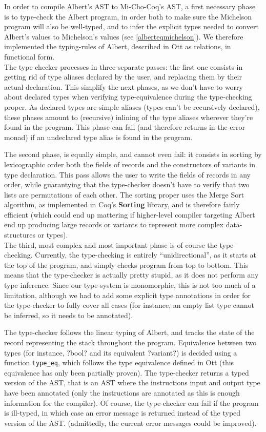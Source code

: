 \documentclass{report}
\begin{document}
In order to compile Albert's AST to Mi-Cho-Coq's AST, a first necessary phase is to type-check the Albert program, in order both to make sure the Michelson program will also be well-typed, and to infer the explicit types needed to convert Albert's values to Michelson's values (see \ref{alberteqmichelson}). We therefore implemented the typing-rules of Albert, described in Ott as relations, in functional form.\\

The type checker processes in three separate passes: the first one consists in getting rid of type aliases declared by the user, and replacing them by their actual declaration. This simplify the next phases, as we don't have to worry about declared types when verifying type-equivalence during the type-checking proper. As declared types are simple aliases (types can't be recursively declared), these phases amount to (recursive) inlining of the type aliases wherever they're found in the program. This phase can fail (and therefore returns in the error monad) if an undeclared type alias is found in the program.

The second phase, is equally simple, and cannot even fail: it consists in sorting by lexicographic order both the fields of records and the constructors of variants in type declaration. This pass allows the user to write the fields of records in any order, while guarantying that the type-checker doesn't have to verify that two lists are permutations of each other. The sorting proper uses the Merge Sort algorithm, as implemented in Coq's \textbf{Sorting} library, and is therefore fairly efficient (which could end up mattering if higher-level compiler targeting Albert end up producing large records or variants to represent more complex data-structures or types).\\

The third, most complex and most important phase is of course the type-checking. Currently, the type-checking is entirely ``unidirectional'', as it starts at the top of the program, and simply checks program from top to bottom. This means that the type-checker is actually pretty stupid, as it does not perform any type inference. Since our type-system is monomorphic, this is not too much of a limitation, although we had to add some explicit type annotations in order for the type-checker to fully cover all cases (for instance, an empty list type cannot be inferred, so it needs to be annotated).

The type-checker follows the linear typing of Albert, and tracks the state of the record representing the stack throughout the program. Equivalence between two types (for instance, ?bool? and its equivalent ?variant?) is decided using a function \texttt{type\_eq}, which follows the type equivalence defined in Ott (this equivalence has only been partially proven). The type-checker returns a typed version of the AST, that is an AST where the instructions input and output type have been annotated (only the instructions are annotated as this is enough information for the compiler). Of course, the type-checker can fail if the program is ill-typed, in which case an error message is returned instead of the typed version of the AST. (admittedly, the current error messages could be improved).
\end{document}
